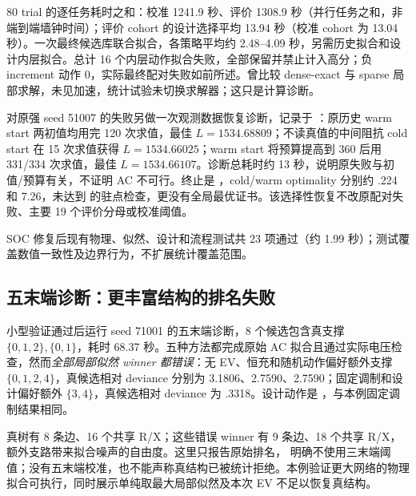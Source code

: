 \documentclass[UTF8,fontset=fandol,11pt,a4paper]{ctexart}
\begin{document}
80 trial 的逐任务耗时之和：校准 1241.9 秒、评价 1308.9 秒（并行任务之和，非端到端墙钟时间）；评价 cohort 的设计选择平均 13.94 秒（校准 cohort 为 13.04 秒）。一次最终候选库联合拟合，各策略平均约 2.48--4.09 秒，另需历史拟合和设计内层拟合。总计 16 个内层动作拟合失败，全部保留并禁止计入高分；负 increment 动作 0，实际最终配对失败如前所述。曾比较 dense-exact 与 sparse 局部求解，未见加速，统计试验未切换求解器；这只是计算诊断。

对原强 seed 51007 的失败另做一次观测数据恢复诊断，记录于 ：原历史 warm start 两初值均用完 120 次求值，最佳 $L=1534.68809$；不读真值的中间阻抗 cold start 在 15 次求值获得 $L=1534.66025$；warm start 将预算提高到 360 后用 331/334 次求值，最佳 $L=1534.66107$。诊断总耗时约 13 秒，说明原失败与初值/预算有关，不证明 AC 不可行。终止是 ，cold/warm optimality 分别约 .224 和 7.26，未达到  的驻点检查，更没有全局最优证书。该选择性恢复不改原配对失败、主要 19 个评价分母或校准阈值。

SOC 修复后现有物理、似然、设计和流程测试共 23 项通过（约 1.99 秒）；测试覆盖数值一致性及边界行为，不扩展统计覆盖范围。

\subsection{五末端诊断：更丰富结构的排名失败}
小型验证通过后运行 seed 71001 的五末端诊断，8 个候选包含真支撑 $\{0,1,2\},\{0,1\}$，耗时 68.37 秒。五种方法都完成原始 AC 拟合且通过实际电压检查，然而\emph{全部局部似然 winner 都错误}：无 EV、恒充和随机动作偏好额外支撑 $\{0,1,2,4\}$，真候选相对 deviance 分别为 3.1806、2.7590、2.7590；固定调制和设计偏好额外 $\{3,4\}$，真候选相对 deviance 为 .3318。设计动作是 ，与本例固定调制结果相同。

真树有 8 条边、16 个共享 R/X；这些错误 winner 有 9 条边、18 个共享 R/X，额外支路带来拟合噪声的自由度。这里只报告原始排名， 明确不使用三末端阈值；没有五末端校准，也不能声称真结构已被统计拒绝。本例验证更大网络的物理拟合可执行，同时展示单纯取最大局部似然及本次 EV 不足以恢复真结构。
\end{document}
